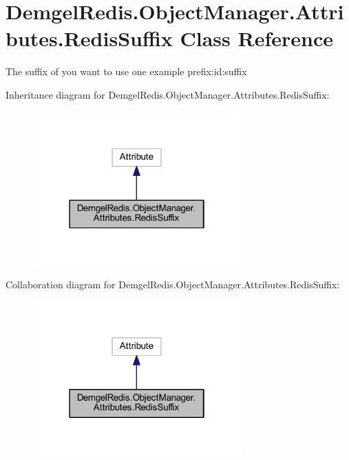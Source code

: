 \hypertarget{class_demgel_redis_1_1_object_manager_1_1_attributes_1_1_redis_suffix}{}\section{Demgel\+Redis.\+Object\+Manager.\+Attributes.\+Redis\+Suffix Class Reference}
\label{class_demgel_redis_1_1_object_manager_1_1_attributes_1_1_redis_suffix}


The suffix of you want to use one example prefix\+:id\+:suffix  




Inheritance diagram for Demgel\+Redis.\+Object\+Manager.\+Attributes.\+Redis\+Suffix\+:
\nopagebreak
\begin{figure}[H]
\begin{center}
\leavevmode
\includegraphics[width=226pt]{class_demgel_redis_1_1_object_manager_1_1_attributes_1_1_redis_suffix__inherit__graph}
\end{center}
\end{figure}


Collaboration diagram for Demgel\+Redis.\+Object\+Manager.\+Attributes.\+Redis\+Suffix\+:
\nopagebreak
\begin{figure}[H]
\begin{center}
\leavevmode
\includegraphics[width=226pt]{class_demgel_redis_1_1_object_manager_1_1_attributes_1_1_redis_suffix__coll__graph}
\end{center}
\end{figure}
